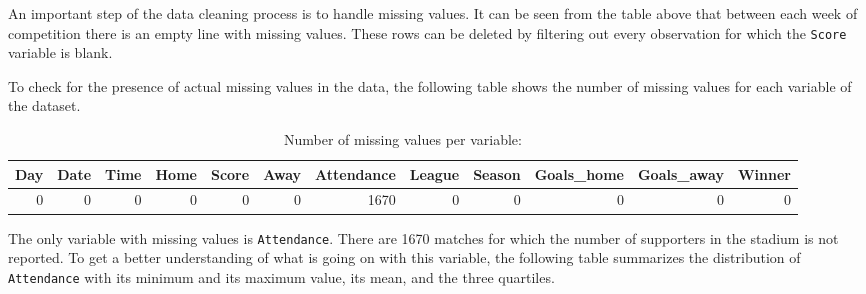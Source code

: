 \documentclass[
]{article}
\newenvironment{Shaded}{\begin{snugshade}}{\end{snugshade}}
\newcommand{\CommentTok}[1]{\textcolor[rgb]{0.56,0.35,0.01}{\textit{#1}}}
\newcommand{\DataTypeTok}[1]{\textcolor[rgb]{0.13,0.29,0.53}{#1}}
\newcommand{\KeywordTok}[1]{\textcolor[rgb]{0.13,0.29,0.53}{\textbf{#1}}}
\newcommand{\NormalTok}[1]{#1}
\newcommand{\OperatorTok}[1]{\textcolor[rgb]{0.81,0.36,0.00}{\textbf{#1}}}
\newcommand{\StringTok}[1]{\textcolor[rgb]{0.31,0.60,0.02}{#1}}
\begin{document}
An important step of the data cleaning process is to handle missing
values. It can be seen from the table above that between each week of
competition there is an empty line with missing values. These rows can
be deleted by filtering out every observation for which the
\texttt{Score} variable is blank.

\begin{Shaded}
\end{Shaded}

To check for the presence of actual missing values in the data, the
following table shows the number of missing values for each variable of
the dataset.

\begin{Shaded}
\end{Shaded}

\begin{table}

\caption{\label{tab:unnamed-chunk-5}Number of missing values per variable:}
\centering
\begin{tabular}[t]{rrrrrrrrrrrr}
\toprule
Day & Date & Time & Home & Score & Away & Attendance & League & Season & Goals\_home & Goals\_away & Winner\\
\midrule
0 & 0 & 0 & 0 & 0 & 0 & 1670 & 0 & 0 & 0 & 0 & 0\\
\bottomrule
\end{tabular}
\end{table}

The only variable with missing values is \texttt{Attendance}. There are
1670 matches for which the number of supporters in the stadium is not
reported. To get a better understanding of what is going on with this
variable, the following table summarizes the distribution of
\texttt{Attendance} with its minimum and its maximum value, its mean,
and the three quartiles.
\end{document}
